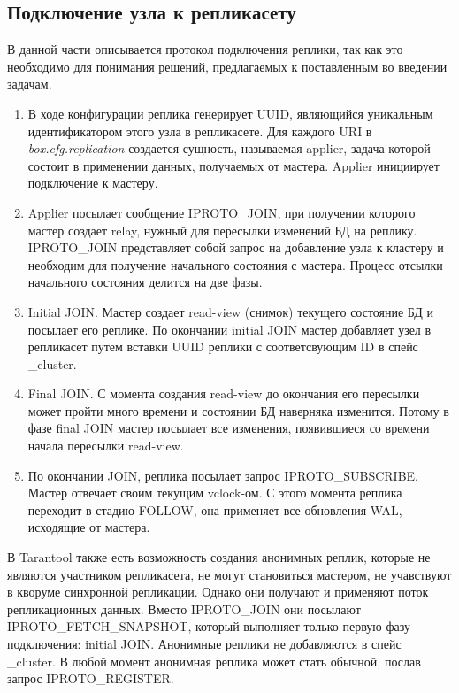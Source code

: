 \subsection{Подключение узла к репликасету}

В данной части описывается протокол подключения реплики, так как это необходимо для понимания решений, предлагаемых к поставленным во введении задачам.

\begin{enumerate}
    \item В ходе конфигурации реплика генерирует UUID, являющийся уникальным идентификатором этого узла в репликасете. Для каждого URI в \textit{box.cfg.replication} создается сущность, называемая applier, задача которой состоит в применении данных, получаемых от мастера. Applier инициирует подключение к мастеру.
    \item Applier посылает сообщение IPROTO\_JOIN, при получении которого мастер создает relay, нужный для пересылки изменений БД на реплику. IPROTO\_JOIN представляет собой запрос на добавление узла к кластеру и необходим для получение начального состояния с мастера. Процесс отсылки начального состояния делится на две фазы.
    \item Initial JOIN. Мастер создает read-view (снимок) текущего состояние БД и посылает его реплике. По окончании initial JOIN мастер добавляет узел в репликасет путем вставки UUID реплики с соответсвующим ID в спейс \_cluster.
    \item Final JOIN. С момента создания read-view до окончания его пересылки может пройти много времени и состоянии БД наверняка изменится. Потому в фазе final JOIN мастер посылает все изменения, появившиеся со времени начала пересылки read-view.
    \item По окончании JOIN, реплика посылает запрос IPROTO\_SUBSCRIBE. Мастер отвечает своим текущим vclock-ом. С этого момента реплика переходит в стадию FOLLOW, она применяет все обновления WAL, исходящие от мастера.
\end{enumerate}

В Tarantool также есть возможность создания анонимных реплик, которые не являются участником репликасета, не могут становиться мастером, не учавствуют в кворуме синхронной репликации. Однако они получают и применяют поток репликационных данных. Вместо IPROTO\_JOIN они посылают IPROTO\_FETCH\_SNAPSHOT, который выполняет только первую фазу подключения: initial JOIN. Анонимные реплики не добавляются в спейс \_cluster. В любой момент анонимная реплика может стать обычной, послав запрос IPROTO\_REGISTER.
